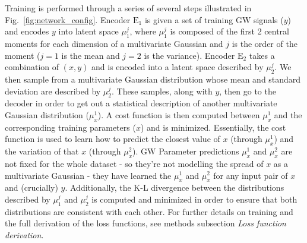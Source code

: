 \documentclass[%
showpacs,
 amsmath,amssymb,
 aps,
 twocolumn,
 prl,
 reprint,
floatfix,
]{revtex4-1}
\begin{document}
%
%
Training is performed through a series of several
steps illustrated in Fig.~\ref{fig:network_config}. Encoder $\textrm{E}_1$ is given a set of training \ac{GW}
signals ($y$) and encodes $y$ into latent space
$\mu^{j}_{1}$, where $\mu^{j}_{1}$ is composed of the first 2 central moments for 
each dimension of a multivariate Gaussian and $j$ is the order of the moment 
($j=1$ is the mean and $j=2$ is the variance). Encoder $\textrm{E}_2$ takes a combination of $(x,y)$ and is
encoded into a latent space described by $\mu^{j}_{2}$.  We then sample
from a multivariate Gaussian distribution whose mean and standard deviation are
described by $\mu^{j}_{2}$. These samples, along with $y$, then go to
the decoder in order to get out a statistical description of another
multivariate Gaussian distribution ($\mu^{1}_x$). A cost function is then
computed between $\mu^{1}_x$ and the corresponding training parameters
($x$) and is minimized.  Essentially, the cost function is used to learn how
to predict the closest value of $x$ (through $\mu^{1}_x$) and the variation of
that $x$ (through $\mu^{2}_x$). \ac{GW} Parameter predictions $\mu^{1}_x$ and $\mu^{2}_x$ are not fixed for the whole
dataset - so they're not modelling the spread of $x$ as a multivariate Gaussian
- they have learned the $\mu^{1}_x$ and $\mu^{2}_x$ for any input pair of $x$
  and (crucially) $y$. Additionally, the K-L divergence between the 
  distributions described by $\mu^{j}_1$ and $\mu^{j}_2$ is computed and minimized in order to ensure that both distributions are
consistent with each other. For further details on training and the full 
derivation of the loss functions, see methods subsection \textit{Loss function derivation}.
\end{document}

